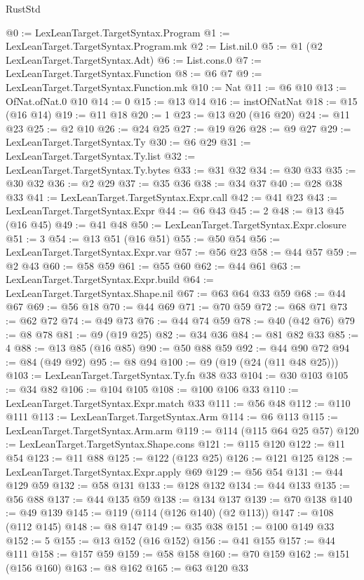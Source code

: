 \begin{lexlean}{RustStd}
\begin{coremodule}
{\begin{coremodule}
{{{{{{{{{{@0 := LexLeanTarget.TargetSyntax.Program
@1 := LexLeanTarget.TargetSyntax.Program.mk
@2 := List.nil.{0}
@5 := @1 (@2 LexLeanTarget.TargetSyntax.Adt)
@6 := List.cons.{0}
@7 := LexLeanTarget.TargetSyntax.Function
@8 := @6 @7
@9 := LexLeanTarget.TargetSyntax.Function.mk
@10 := Nat
@11 := @6 @10
@13 := OfNat.ofNat.{0} @10
@14 := 0
@15 := @13 @14
@16 := instOfNatNat
@18 := @15 (@16 @14)
@19 := @11 @18
@20 := 1
@23 := @13 @20 (@16 @20)
@24 := @11 @23
@25 := @2 @10
@26 := @24 @25
@27 := @19 @26
@28 := @9 @27
@29 := LexLeanTarget.TargetSyntax.Ty
@30 := @6 @29
@31 := LexLeanTarget.TargetSyntax.Ty.list
@32 := LexLeanTarget.TargetSyntax.Ty.bytes
@33 := @31 @32
@34 := @30 @33
@35 := @30 @32
@36 := @2 @29
@37 := @35 @36
@38 := @34 @37
@40 := @28 @38 @33
@41 := LexLeanTarget.TargetSyntax.Expr.call
@42 := @41 @23
@43 := LexLeanTarget.TargetSyntax.Expr
@44 := @6 @43
@45 := 2
@48 := @13 @45 (@16 @45)
@49 := @41 @48
@50 := LexLeanTarget.TargetSyntax.Expr.closure
@51 := 3
@54 := @13 @51 (@16 @51)
@55 := @50 @54
@56 := LexLeanTarget.TargetSyntax.Expr.var
@57 := @56 @23
@58 := @44 @57
@59 := @2 @43
@60 := @58 @59
@61 := @55 @60
@62 := @44 @61
@63 := LexLeanTarget.TargetSyntax.Expr.build
@64 := LexLeanTarget.TargetSyntax.Shape.nil
@67 := @63 @64 @33 @59
@68 := @44 @67
@69 := @56 @18
@70 := @44 @69
@71 := @70 @59
@72 := @68 @71
@73 := @62 @72
@74 := @49 @73
@76 := @44 @74 @59
@78 := @40 (@42 @76)
@79 := @8 @78
@81 := @9 (@19 @25)
@82 := @34 @36
@84 := @81 @82 @33
@85 := 4
@88 := @13 @85 (@16 @85)
@90 := @50 @88 @59
@92 := @44 @90 @72
@94 := @84 (@49 @92)
@95 := @8 @94
@100 := @9 (@19 (@24 (@11 @48 @25)))
@103 := LexLeanTarget.TargetSyntax.Ty.fn @38 @33
@104 := @30 @103
@105 := @34 @82
@106 := @104 @105
@108 := @100 @106 @33
@110 := LexLeanTarget.TargetSyntax.Expr.match @33
@111 := @56 @48
@112 := @110 @111
@113 := LexLeanTarget.TargetSyntax.Arm
@114 := @6 @113
@115 := LexLeanTarget.TargetSyntax.Arm.arm
@119 := @114 (@115 @64 @25 @57)
@120 := LexLeanTarget.TargetSyntax.Shape.cons
@121 := @115 @120
@122 := @11 @54
@123 := @11 @88
@125 := @122 (@123 @25)
@126 := @121 @125
@128 := LexLeanTarget.TargetSyntax.Expr.apply @69
@129 := @56 @54
@131 := @44 @129 @59
@132 := @58 @131
@133 := @128 @132
@134 := @44 @133
@135 := @56 @88
@137 := @44 @135 @59
@138 := @134 @137
@139 := @70 @138
@140 := @49 @139
@145 := @119 (@114 (@126 @140) (@2 @113))
@147 := @108 (@112 @145)
@148 := @8 @147
@149 := @35 @38
@151 := @100 @149 @33
@152 := 5
@155 := @13 @152 (@16 @152)
@156 := @41 @155
@157 := @44 @111
@158 := @157 @59
@159 := @58 @158
@160 := @70 @159
@162 := @151 (@156 @160)
@163 := @8 @162
@165 := @63 @120 @33
}}}}}}}}}}
\end{coremodule}}
\end{coremodule}
\end{lexlean}
